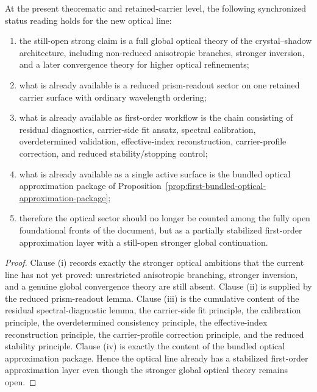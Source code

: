 \begin{proposition}
\label{prop:v323-optical-open-question-status-synchronization-principle}
At the present theorematic and retained-carrier level, the following synchronized status reading holds for the new optical line:
\begin{enumerate}[leftmargin=2em,label=(\roman*)]
 \item the still-open strong claim is a full global optical theory of the crystal--shadow architecture, including non-reduced anisotropic branches, stronger inversion, and a later convergence theory for higher optical refinements;
 \item what is already available is a reduced prism-readout sector on one retained carrier surface with ordinary wavelength ordering;
 \item what is already available as first-order workflow is the chain consisting of residual diagnostics, carrier-side fit ansatz, spectral calibration, overdetermined validation, effective-index reconstruction, carrier-profile correction, and reduced stability/stopping control;
 \item what is already available as a single active surface is the bundled optical approximation package of Proposition~\ref{prop:first-bundled-optical-approximation-package};
 \item therefore the optical sector should no longer be counted among the fully open foundational fronts of the document, but as a partially stabilized first-order approximation layer with a still-open stronger global continuation.
\end{enumerate}
\end{proposition}

\begin{proof}
Clause (i) records exactly the stronger optical ambitions that the current line has not yet proved: unrestricted anisotropic branching, stronger inversion, and a genuine global convergence theory are still absent. Clause (ii) is supplied by the reduced prism-readout lemma. Clause (iii) is the cumulative content of the residual spectral-diagnostic lemma, the carrier-side fit principle, the calibration principle, the overdetermined consistency principle, the effective-index reconstruction principle, the carrier-profile correction principle, and the reduced stability principle. Clause (iv) is exactly the content of the bundled optical approximation package. Hence the optical line already has a stabilized first-order approximation layer even though the stronger global optical theory remains open.
\end{proof}

